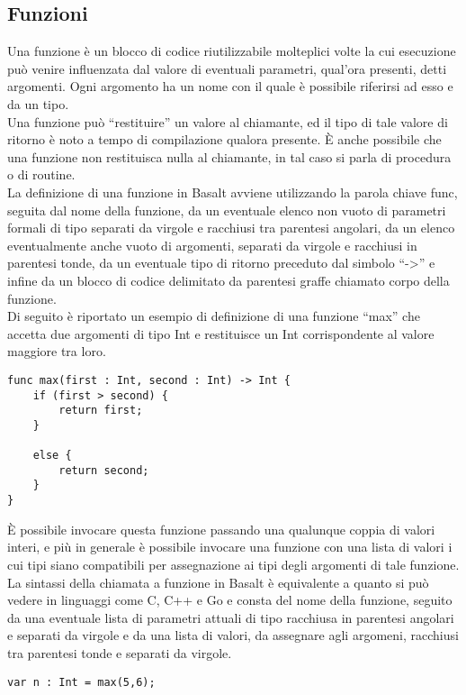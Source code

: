 \subsection{Funzioni}
Una funzione è un blocco di codice riutilizzabile molteplici volte la cui esecuzione può venire 
influenzata dal valore di eventuali parametri, qual’ora presenti, detti argomenti. Ogni argomento 
ha un nome con il quale è possibile riferirsi ad esso e da un tipo. \\

Una funzione può “restituire” un valore al chiamante, ed il tipo di tale valore di ritorno 
è noto a tempo di compilazione qualora presente. È anche possibile che una funzione 
non restituisca nulla al chiamante, in tal caso si parla di procedura o di routine. \\

La definizione di una funzione in Basalt avviene utilizzando la parola chiave func, seguita 
dal nome della funzione, da un eventuale elenco non vuoto di parametri 
formali di tipo separati da virgole e racchiusi tra parentesi angolari, 
da un elenco eventualmente anche vuoto di argomenti, separati da virgole e 
racchiusi in parentesi tonde, da un eventuale tipo di ritorno preceduto 
dal simbolo “->” e infine da un blocco di codice delimitato da parentesi graffe 
chiamato corpo della funzione. \\ 

Di seguito è riportato un esempio di definizione di una funzione “max” che accetta 
due argomenti di tipo Int e restituisce un Int corrispondente al valore maggiore tra loro.

\vspace{0.5cm}
\begin{lstlisting}[frame=single]
func max(first : Int, second : Int) -> Int {
    if (first > second) {
        return first; 
    }
    
    else {
        return second;
    }
}
\end{lstlisting}
\vspace{0.5cm}

È possibile invocare questa funzione passando una qualunque coppia di valori interi, 
e più in generale è possibile invocare una funzione con una lista di valori i cui tipi 
siano compatibili per assegnazione ai tipi degli argomenti di tale funzione. La sintassi 
della chiamata a funzione in Basalt è equivalente a quanto si può vedere in linguaggi 
come C, C++ e Go e consta del nome della funzione, seguito da una eventuale lista di 
parametri attuali di tipo racchiusa in parentesi angolari e separati da virgole e 
da una lista di valori, da assegnare agli argomeni, racchiusi tra parentesi tonde 
e separati da virgole.

\vspace{0.5cm}
\begin{lstlisting}[frame=single]
var n : Int = max(5,6);
\end{lstlisting}
\vspace{0.5cm}
\newpage

